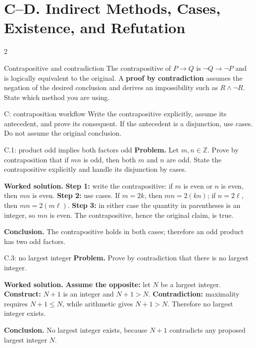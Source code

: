\documentclass[10pt]{article}
\newcommand{\term}[1]{\textbf{\color{CoreNavy}#1}}
\begin{document}
\section*{C--D. Indirect Methods, Cases, Existence, and Refutation}
\begin{multicols}{2}
\begin{definitionbox}{Contrapositive and contradiction}
The contrapositive of $P\to Q$ is $\neg Q\to\neg P$ and is logically
equivalent to the original. A \term{proof by contradiction} assumes the
negation of the desired conclusion and derives an impossibility such as
$R\land\neg R$. State which method you are using.
\end{definitionbox}

\begin{methodbox}{C: contraposition workflow}
Write the contrapositive explicitly, assume its antecedent, and prove its
consequent. If the antecedent is a disjunction, use cases. Do not assume the
original conclusion.
\end{methodbox}

\begin{workedbox}{C.1: product odd implies both factors odd}
\textbf{Problem.} Let $m,n\in\mathbb Z$. Prove by contraposition that if $mn$ is odd, then both $m$ and $n$ are odd. State the contrapositive explicitly and handle its disjunction by cases.

\textbf{Worked solution.} \textbf{Step 1:} write the contrapositive: if $m$ is even or $n$ is even, then
$mn$ is even. \textbf{Step 2:} use cases. If $m=2k$, then $mn=2(kn)$; if
$n=2\ell$, then $mn=2(m\ell)$. \textbf{Step 3:} in either case the quantity in
parentheses is an integer, so $mn$ is even. The contrapositive, hence the
original claim, is true.

\textbf{Conclusion.} The contrapositive holds in both cases; therefore an odd product has two odd factors.
\end{workedbox}

\begin{workedbox}{C.3: no largest integer}
\textbf{Problem.} Prove by contradiction that there is no largest integer.

\textbf{Worked solution.} \textbf{Assume the opposite:} let $N$ be a largest integer. \textbf{Construct:}
$N+1$ is an integer and $N+1>N$. \textbf{Contradiction:} maximality requires
$N+1\le N$, while arithmetic gives $N+1>N$. Therefore no largest integer
exists.

\textbf{Conclusion.} No largest integer exists, because $N+1$ contradicts any proposed largest integer $N$.
\end{workedbox}


\end{multicols}
\end{document}
